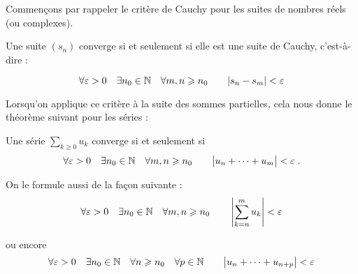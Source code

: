 %
%
%
%
%
%
%
%

\diapo

Commençons par rappeler  le critère de Cauchy pour les suites de nombres réels (ou complexes).

Une suite $(s_n)$ converge si et seulement si elle est une suite de Cauchy, c'est-à-dire :

\change
$$\forall \varepsilon>0\quad \exists n_0\in\mathbb{N} \quad \forall m,n \geqslant n_0 \qquad |s_n-s_m|<\varepsilon$$


\change
Lorsqu'on applique ce critère à la suite des sommes partielles,
cela nous donne le théorème suivant pour les séries  : 

Une série  $\displaystyle\sum_{k\geq0} u_k$ converge si et seulement si  
$$\forall \varepsilon>0 \quad \exists n_0\in\mathbb{N} \quad \forall m,n\geqslant n_0 \qquad \big|u_{n}+\cdots +u_m\big| < \varepsilon \; .$$

\change
On le formule aussi de la façon suivante :
$$ \forall \varepsilon>0 \quad \exists n_0\in\mathbb{N} \quad
\forall m,n \geqslant n_0 \qquad  \left| \sum_{k=n}^m u_k\right| <\varepsilon$$

\change
ou encore
$$ \forall \varepsilon>0 \quad \exists n_0\in\mathbb{N} \quad
\forall n\geqslant n_0 \quad \forall p\in\mathbb{N} 
\qquad  \big|u_{n}+\cdots +u_{n+p}\big|<\varepsilon$$


\diapo

